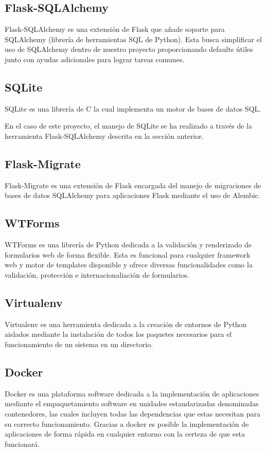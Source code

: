\subsection{Flask-SQLAlchemy}
Flask-SQLAlchemy\cite{tool:Flask-SQLAlchemy} es una extensión de Flask que añade soporte para SQLAlchemy (librería de herramientas SQL de Python). Esta busca simplificar el uso de SQLAlchemy\cite{tool:SQLAlchemy} dentro de nuestro proyecto proporcionando defaults útiles junto con ayudas adicionales para lograr tareas comunes.

\subsection{SQLite}
SQLite\cite{tool:SQLite} es una librería de C la cual implementa un motor de bases de datos SQL.

En el caso de este proyecto, el manejo de SQLite se ha realizado a través de la herramienta Flask-SQLAlchemy descrita en la sección anterior.

\subsection{Flask-Migrate}
Flask-Migrate\cite{tool:Flask-Migrate} es una extensión de Flask encargada del manejo de migraciones de bases de datos SQLAlchemy para aplicaciones Flask mediante el uso de Alembic.

\subsection{WTForms}
WTForms\cite{tool:WTForms}\cite{tool:Flask-WTForms}   es una librería de Python dedicada a la validación y renderizado de formularios web de forma flexible. Esta es funcional para cualquier framework web y motor de templates disponible y ofrece diversas funcionalidades como la validación, protección e internacionaliación de formularios.

\subsection{Virtualenv}
Virtualenv\cite{tool:Virtualenv} es una herramienta dedicada a la creación de entornos de Python aislados mediante la instalación de todos los paquetes necesarios para el funcionamiento de un sistema en un directorio.

\subsection{Docker}
Docker\cite{tool:Docker} es una plataforma software dedicada a la implementación de aplicaciones mediante el empaquetamiento software en unidades estandarizadas denominadas contenedores, las cuales incluyen todas las dependencias que estas necesitan para su correcto funcionamiento. Gracias a docker es posible la implementación de aplicaciones de forma rápida en cualquier entorno con la certeza de que esta funcionará.

